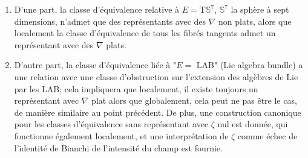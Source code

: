 \documentclass[a4paper,twoside,11pt]{scrbook}
\theoremstyle{plain}
\theoremstyle{remark}
\theoremstyle{definition}
\begin{document}
\begin{itemize}
	\begin{enumerate}
	\item D'une part, la classe d'équivalence relative à $E = \mathrm{T}\mathds{S}^7$, $\mathds{S}^7$ la sphère à sept dimensions, n'admet que des représentants avec des $\nabla$ non plats, alors que localement la classe d'équivalence de tous les fibrés tangents admet un représentant avec des $\nabla$ plats.
	\item D'autre part, la classe d'équivalence liée à "$E=$ LAB" (Lie algebra bundle) a une relation avec une classe d'obstruction sur l'extension des algèbres de Lie par les LAB; cela impliquera que localement, il existe toujours un représentant avec $\nabla$ plat alors que globalement, cela peut ne pas être le cas, de manière similaire au point précédent. De plus, une construction canonique pour les classes d'équivalence sans représentant avec $\zeta$ nul est donnée, qui fonctionne également localement, et une interprétation de $\zeta$ comme échec de l'identité de Bianchi de l'intensité du champ est fournie. 
	\end{enumerate}
\end{itemize}

\setcounter{page}{10}
\thispagestyle{empty}\hspace{1em}\newpage




\tableofcontents







\setlength{\parindent}{12 pt}

\newpage
\thispagestyle{empty}\hspace{1em}
\newpage

\newpage
\thispagestyle{empty}\hspace{1em}
\newpage



\setcounter{equation}{0}








\end{document}
